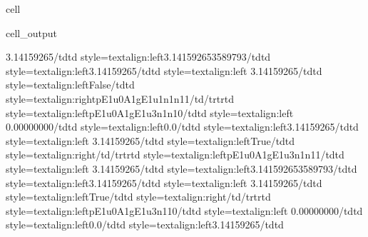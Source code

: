 \documentclass[letterpaper,table,10pt,english]{jupyterBook}
\begin{document}
\begin{sphinxuseclass}{cell}
\begin{sphinxVerbatimOutput}
\begin{sphinxuseclass}{cell_output}
\begin{sphinxVerbatim}[commandchars=\\\{\}]
3.14159265\PYGZlt{}/td\PYGZgt{}\PYGZlt{}td style=\PYGZbs{}\PYGZsq{}text\PYGZhy{}align:left\PYGZbs{}\PYGZsq{}\PYGZgt{}3.141592653589793\PYGZlt{}/td\PYGZgt{}\PYGZlt{}td style=\PYGZbs{}\PYGZsq{}text\PYGZhy{}align:left\PYGZbs{}\PYGZsq{}\PYGZgt{}\PYGZhy{}3.14159265\PYGZlt{}/td\PYGZgt{}\PYGZlt{}td style=\PYGZbs{}\PYGZsq{}text\PYGZhy{}align:left\PYGZbs{}\PYGZsq{}\PYGZgt{} 3.14159265\PYGZlt{}/td\PYGZgt{}\PYGZlt{}td style=\PYGZbs{}\PYGZsq{}text\PYGZhy{}align:left\PYGZbs{}\PYGZsq{}\PYGZgt{}False\PYGZlt{}/td\PYGZgt{}\PYGZlt{}td style=\PYGZbs{}\PYGZsq{}text\PYGZhy{}align:right\PYGZbs{}\PYGZsq{}\PYGZgt{}p\PYGZus{}E1u\PYGZus{}0\PYGZus{}A1g\PYGZus{}E1u\PYGZus{}1\PYGZus{}n1\PYGZus{}n1\PYGZus{}1\PYGZlt{}/td\PYGZgt{}\PYGZlt{}/tr\PYGZgt{}\PYGZlt{}tr\PYGZgt{}\PYGZlt{}td style=\PYGZbs{}\PYGZsq{}text\PYGZhy{}align:left\PYGZbs{}\PYGZsq{}\PYGZgt{}p\PYGZus{}E1u\PYGZus{}0\PYGZus{}A1g\PYGZus{}E1u\PYGZus{}3\PYGZus{}n1\PYGZus{}n1\PYGZus{}0\PYGZlt{}/td\PYGZgt{}\PYGZlt{}td style=\PYGZbs{}\PYGZsq{}text\PYGZhy{}align:left\PYGZbs{}\PYGZsq{}\PYGZgt{} 0.00000000\PYGZlt{}/td\PYGZgt{}\PYGZlt{}td style=\PYGZbs{}\PYGZsq{}text\PYGZhy{}align:left\PYGZbs{}\PYGZsq{}\PYGZgt{}0.0\PYGZlt{}/td\PYGZgt{}\PYGZlt{}td style=\PYGZbs{}\PYGZsq{}text\PYGZhy{}align:left\PYGZbs{}\PYGZsq{}\PYGZgt{}\PYGZhy{}3.14159265\PYGZlt{}/td\PYGZgt{}\PYGZlt{}td style=\PYGZbs{}\PYGZsq{}text\PYGZhy{}align:left\PYGZbs{}\PYGZsq{}\PYGZgt{} 3.14159265\PYGZlt{}/td\PYGZgt{}\PYGZlt{}td style=\PYGZbs{}\PYGZsq{}text\PYGZhy{}align:left\PYGZbs{}\PYGZsq{}\PYGZgt{}True\PYGZlt{}/td\PYGZgt{}\PYGZlt{}td style=\PYGZbs{}\PYGZsq{}text\PYGZhy{}align:right\PYGZbs{}\PYGZsq{}\PYGZgt{}\PYGZlt{}/td\PYGZgt{}\PYGZlt{}/tr\PYGZgt{}\PYGZlt{}tr\PYGZgt{}\PYGZlt{}td style=\PYGZbs{}\PYGZsq{}text\PYGZhy{}align:left\PYGZbs{}\PYGZsq{}\PYGZgt{}p\PYGZus{}E1u\PYGZus{}0\PYGZus{}A1g\PYGZus{}E1u\PYGZus{}3\PYGZus{}n1\PYGZus{}n1\PYGZus{}1\PYGZlt{}/td\PYGZgt{}\PYGZlt{}td style=\PYGZbs{}\PYGZsq{}text\PYGZhy{}align:left\PYGZbs{}\PYGZsq{}\PYGZgt{} 3.14159265\PYGZlt{}/td\PYGZgt{}\PYGZlt{}td style=\PYGZbs{}\PYGZsq{}text\PYGZhy{}align:left\PYGZbs{}\PYGZsq{}\PYGZgt{}3.141592653589793\PYGZlt{}/td\PYGZgt{}\PYGZlt{}td style=\PYGZbs{}\PYGZsq{}text\PYGZhy{}align:left\PYGZbs{}\PYGZsq{}\PYGZgt{}\PYGZhy{}3.14159265\PYGZlt{}/td\PYGZgt{}\PYGZlt{}td style=\PYGZbs{}\PYGZsq{}text\PYGZhy{}align:left\PYGZbs{}\PYGZsq{}\PYGZgt{} 3.14159265\PYGZlt{}/td\PYGZgt{}\PYGZlt{}td style=\PYGZbs{}\PYGZsq{}text\PYGZhy{}align:left\PYGZbs{}\PYGZsq{}\PYGZgt{}True\PYGZlt{}/td\PYGZgt{}\PYGZlt{}td style=\PYGZbs{}\PYGZsq{}text\PYGZhy{}align:right\PYGZbs{}\PYGZsq{}\PYGZgt{}\PYGZlt{}/td\PYGZgt{}\PYGZlt{}/tr\PYGZgt{}\PYGZlt{}tr\PYGZgt{}\PYGZlt{}td style=\PYGZbs{}\PYGZsq{}text\PYGZhy{}align:left\PYGZbs{}\PYGZsq{}\PYGZgt{}p\PYGZus{}E1u\PYGZus{}0\PYGZus{}A1g\PYGZus{}E1u\PYGZus{}3\PYGZus{}n1\PYGZus{}1\PYGZus{}0\PYGZlt{}/td\PYGZgt{}\PYGZlt{}td style=\PYGZbs{}\PYGZsq{}text\PYGZhy{}align:left\PYGZbs{}\PYGZsq{}\PYGZgt{} 0.00000000\PYGZlt{}/td\PYGZgt{}\PYGZlt{}td style=\PYGZbs{}\PYGZsq{}text\PYGZhy{}align:left\PYGZbs{}\PYGZsq{}\PYGZgt{}0.0\PYGZlt{}/td\PYGZgt{}\PYGZlt{}td style=\PYGZbs{}\PYGZsq{}text\PYGZhy{}align:left\PYGZbs{}\PYGZsq{}\PYGZgt{}\PYGZhy{}3.14159265\PYGZlt{}/td\PYGZgt{}\PYGZlt{}td 
\end{sphinxVerbatim}
\end{sphinxuseclass}
\end{sphinxVerbatimOutput}
\end{sphinxuseclass}
\end{document}
